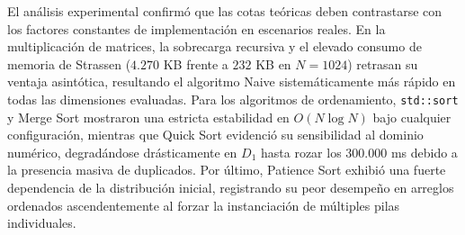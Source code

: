 

El análisis experimental confirmó que las cotas teóricas deben contrastarse con los factores constantes de implementación en escenarios reales. En la multiplicación de matrices, la sobrecarga recursiva y el elevado consumo de memoria de Strassen ($4.270$ KB frente a $232$ KB en $N=1024$) retrasan su ventaja asintótica, resultando el algoritmo Naive sistemáticamente más rápido en todas las dimensiones evaluadas. Para los algoritmos de ordenamiento, \texttt{std::sort} y Merge Sort mostraron una estricta estabilidad en $O(N \log N)$ bajo cualquier configuración, mientras que Quick Sort evidenció su sensibilidad al dominio numérico, degradándose drásticamente en $D_1$ hasta rozar los $300.000$ ms debido a la presencia masiva de duplicados. Por último, Patience Sort exhibió una fuerte dependencia de la distribución inicial, registrando su peor desempeño en arreglos ordenados ascendentemente al forzar la instanciación de múltiples pilas individuales.
